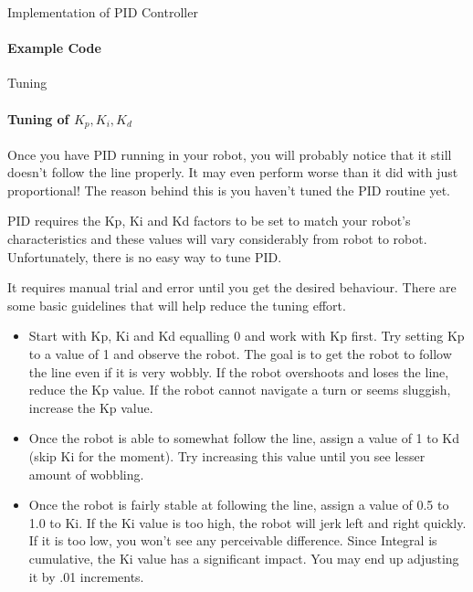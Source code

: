 \documentclass{beamer}
\begin{document}
  \begin{frame}[allowframebreaks]{Implementation of PID Controller}
  
  \framesubtitle{Example Code}
  
  \pid
  
  \end{frame}
  
  \begin{frame}[allowframebreaks]{Tuning}
  	\framesubtitle{Tuning of $K_{p}, K_{i}, K_{d}$}
  	
  	
  	Once you have PID running in your robot, you will probably notice that it still doesn't follow the line properly. It may even perform worse than it did with just proportional!  The reason behind this is you haven't tuned the PID routine yet.  
		\bigskip
		
		PID requires the Kp, Ki and Kd factors to be set to match your robot's characteristics and these values will vary considerably from robot to robot.  Unfortunately, there is no easy way to tune PID. 
		
		\bigskip
		
		It requires manual trial and error until you get the desired behaviour.  There are some basic guidelines that will help reduce the tuning effort.
  	
  	\begin{itemize}
  		
		
		
		
\item{Start with Kp, Ki and Kd equalling 0 and work with Kp first. Try setting Kp to a value of 1 and observe the robot. The goal is to get the robot to follow the line even if it is very wobbly. If the robot overshoots and loses the line, reduce the Kp value. If the robot cannot navigate a turn or seems sluggish, increase the Kp value.}


\item{Once the robot is able to somewhat follow the line, assign a value of 1 to Kd (skip Ki for the moment). Try increasing this value until you see lesser amount of wobbling.}


\item{Once the robot is fairly stable at following the line, assign a value of 0.5 to 1.0 to Ki. If the Ki value is too high, the robot will jerk left and right quickly. If it is too low, you won't see any perceivable difference.  Since Integral is cumulative, the Ki value has a significant impact. You may end up adjusting it by .01 increments.}



\end{itemize}
\end{frame}
\end{document}
